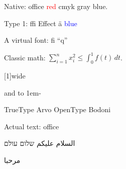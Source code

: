 \documentclass{article}
\begin{document}
Native: office \textcolor{red}{red} \textcolor[cmyk]{0,1,1,0}{cmyk}
\textcolor[gray]{0.5}{gray} {\bluefont blue}.

{\selectfont Type 1: ffi Effect \"a
\textcolor{blue}{blue}}

{\selectfont A virtual font: fi ``q''}

Classic math: $\sum_{i=1}^n x_i^2 \le \int_0^1 f(t)\,dt$.

 \scalebox{2}[1]{wide} 

 and \leaders\hbox to 1em{\hss-\hss}\hskip 2cm

{\arvo TrueType Arvo} {\bodoni OpenType Bodoni}

{ Actual text: office}

{\arabicfont\beginR السلام عليكم\endR} {\hebrewfont\beginR שלום עולם\endR}

{ \arabicfont\beginR مرحبا\endR}
\end{document}
